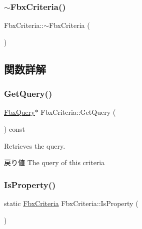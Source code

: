 \mbox{\label{class_fbx_criteria_a02a46eab5950a5b6a5059e2db3328713}} 
\subsubsection{\texorpdfstring{$\sim$\+Fbx\+Criteria()}{~FbxCriteria()}}
{\footnotesize\ttfamily Fbx\+Criteria\+::$\sim$\+Fbx\+Criteria (\begin{DoxyParamCaption}{ }\end{DoxyParamCaption})}



\subsection{関数詳解}
\mbox{\label{class_fbx_criteria_ac91d0ae92b399ad78114d851d08cd850}} 
\subsubsection{\texorpdfstring{Get\+Query()}{GetQuery()}}
{\footnotesize\ttfamily \hyperlink{class_fbx_query}{Fbx\+Query}$\ast$ Fbx\+Criteria\+::\+Get\+Query (\begin{DoxyParamCaption}{ }\end{DoxyParamCaption}) const}

Retrieves the query. \begin{DoxyReturn}{戻り値}
The query of this criteria 
\end{DoxyReturn}
\mbox{\label{class_fbx_criteria_abe944a4f8d41017f7043b4855f03d20e}} 
\subsubsection{\texorpdfstring{Is\+Property()}{IsProperty()}}
{\footnotesize\ttfamily static \hyperlink{class_fbx_criteria}{Fbx\+Criteria} Fbx\+Criteria\+::\+Is\+Property (\begin{DoxyParamCaption}{ }\end{DoxyParamCaption})\hspace{0.3cm}{\ttfamily [static]}}



